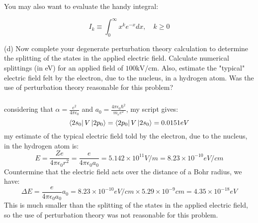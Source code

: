 \documentclass[12pt]{article}
\begin{document}
You may also want to evaluate the handy integral:

$$
I_{k} \equiv \int_{0}^{\infty} x^{k} e^{-x} d x, \quad k \geq 0
$$

(d) Now complete your degenerate perturbation theory calculation to determine the splitting of the states in the applied electric field. Calculate numerical splittings (in eV) for an applied field of $100 \mathrm{kV} / \mathrm{cm}$. Also, estimate the "typical" electric field felt by the electron, due to the nucleus, in a hydrogen atom. Was the use of perturbation theory reasonable for this problem?
\subsubsection{}
considering that $\alpha = \frac{e^2}{4\pi\epsilon_0}$ and $a_0 = \frac{4\pi\epsilon_0\hbar^2}{m_e e^2}$, my script gives:
\begin{equation}
  \bra{2s_{0}}V\ket{2p_{0}} = \bra{2p_{0}}V\ket{2s_{0}} = 0.0151 eV
\end{equation}
my estimate of the typical electric field told by the electron, due to the nucleus, in the hydrogen atom is:
\begin{equation}
  E = \frac{Ze}{4\pi\epsilon_0 r^2} = \frac{e}{4\pi\epsilon_0 a_0} = 5.142 \times 10^{11} V/m = 8.23 \times 10^{-10} eV/cm
\end{equation}
Countermine that the electric field acts over the distance of a Bohr radius, we have:
\begin{equation}
  \Delta E = \frac{e}{4\pi\epsilon_0 a_0} a_0 = 8.23 \times 10^{-10} eV/cm \times 5.29 \times 10^{-9} cm = 4.35 \times 10^{-18} eV
\end{equation}
This is much smaller than the splitting of the states in the applied electric field, so the use of perturbation theory was not reasonable for this problem.
\end{document}
